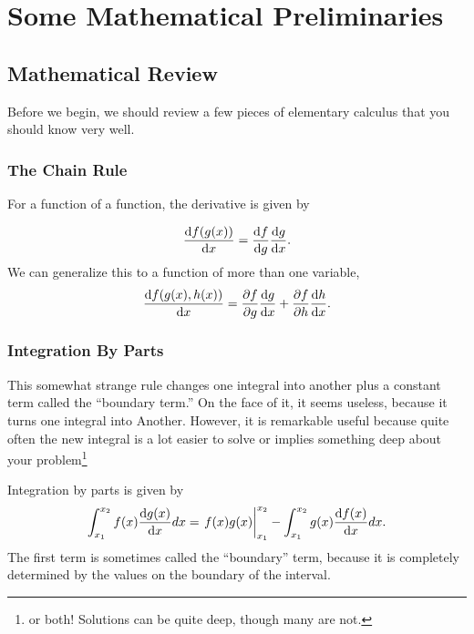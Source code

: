 \chapter{Some Mathematical Preliminaries}

\section{Mathematical Review}
\label{sec:review}

Before we begin, we should review a few pieces of elementary calculus that you should know very well.

\subsection{The Chain Rule}
\label{sec:chain_rule}
For a function of a function, the derivative is given by

\begin{equation}
  \label{eq:chain_rule_def}
  \dv{f(g(x))}{x} = \dv{f}{g} \dv{g}{x}.
\end{equation}
We can generalize this to a function of more than one variable,
\begin{equation}
  \label{eq:multivar_chain_rule_def}
  \dv{f(g(x), h(x))}{x} = \pdv{f}{g} \dv{g}{x} + \pdv{f}{h} \dv{h}{x}.
\end{equation}

\subsection{Integration By Parts}
\label{sec:IBP}
This somewhat strange rule changes one integral into another plus a constant term called the ``boundary term.''  On the face of it, it seems useless, because it turns one integral into Another. However, it is remarkable useful because quite often the new integral is a lot easier to solve or implies something deep about your problem\footnote{or both! Solutions can be quite deep, though many are not.}

Integration by parts is given by
\begin{equation}
  \label{eq:IBP_def}
  \int_{x_1}^{x_2} f(x) \dv{g(x)}{x} dx = \eval{f(x) g(x)}_{x_1}^{x_2} - \int_{x_1}^{x_2} g(x) \dv{f(x)}{x} dx.
\end{equation}
The first term is sometimes called the ``boundary'' term, because it is completely determined by the values on the boundary of the interval.

